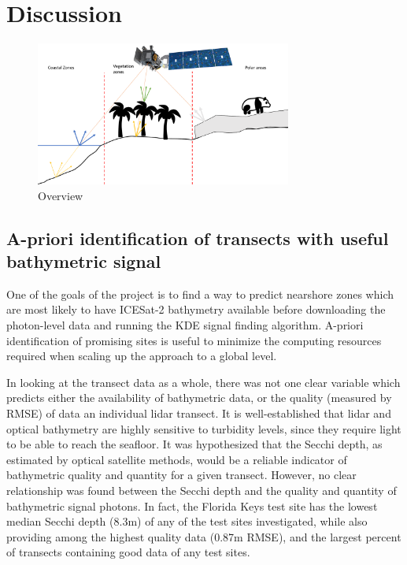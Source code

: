 \chapter{Discussion}

\begin{figure}[h!]
    \centering
    \includegraphics[width=0.75\textwidth]{figures/summary.pdf}
    \caption{Overview}
    \label{fig:icesat-summary-image}
\end{figure}

\section{A-priori identification of transects with useful bathymetric signal}
 One of the goals of the project is to find a way to predict nearshore zones which are most likely to have ICESat-2 bathymetry available before downloading the photon-level data and running the KDE signal finding algorithm. A-priori identification of promising sites is useful to minimize the computing resources required when scaling up the approach to a global level.

In looking at the transect data as a whole, there was not one clear variable which predicts either the availability of bathymetric data, or the quality  (measured by RMSE) of data an individual lidar transect. It is well-established that lidar and optical bathymetry are highly sensitive to turbidity levels, since they require light to be able to reach the seafloor. It was hypothesized that the Secchi depth, as estimated by optical satellite methods, would be a reliable indicator of bathymetric quality and quantity for a given transect. However, no clear relationship was found between the Secchi depth and the quality and quantity of bathymetric signal photons. In fact, the Florida Keys test site has the lowest median Secchi depth (8.3m) of any of the test sites investigated, while also providing among the highest quality data (0.87m RMSE), and the largest percent of transects containing good data of any test sites. 

